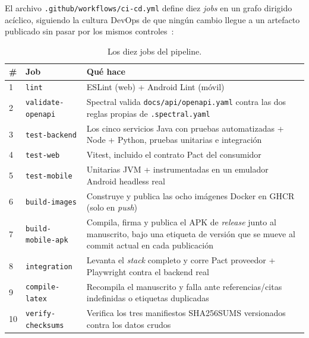 El archivo \texttt{.github/workflows/ci-cd.yml} define diez \emph{jobs} en un grafo dirigido
acíclico, siguiendo la cultura DevOps de que ningún cambio llegue a un artefacto publicado sin
pasar por los mismos controles~\cite{kim2021devops,humble2010continuous}:

\begin{table}[H]
\centering
\small
\caption{Los diez jobs del pipeline.}
\label{tab:cicd}
\begin{tabular}{@{}p{0.6cm}p{2.6cm}p{9.5cm}@{}}
\toprule
\textbf{\#} & \textbf{Job} & \textbf{Qué hace} \\
\midrule
1 & \texttt{lint} & ESLint (web) + Android Lint (móvil) \\
2 & \texttt{validate-openapi} & Spectral valida \texttt{docs/api/openapi.yaml} contra las dos reglas propias de \texttt{.spectral.yaml} \\
3 & \texttt{test-backend} & Los cinco servicios Java con pruebas automatizadas + Node + Python, pruebas unitarias e integración \\
4 & \texttt{test-web} & Vitest, incluido el contrato Pact del consumidor \\
5 & \texttt{test-mobile} & Unitarias JVM + instrumentadas en un emulador Android headless real \\
6 & \texttt{build-images} & Construye y publica las ocho imágenes Docker en GHCR (solo en \emph{push}) \\
7 & \texttt{build-mobile-apk} & Compila, firma y publica el APK de \emph{release} junto al manuscrito, bajo una etiqueta de versión que se mueve al commit actual en cada publicación \\
8 & \texttt{integration} & Levanta el \emph{stack} completo y corre Pact proveedor + Playwright contra el backend real \\
9 & \texttt{compile-latex} & Recompila el manuscrito y falla ante referencias/citas indefinidas o etiquetas duplicadas \\
10 & \texttt{verify-checksums} & Verifica los tres manifiestos SHA256SUMS versionados contra los datos crudos \\
\bottomrule
\end{tabular}
\end{table}

